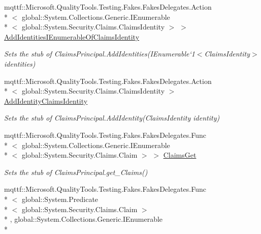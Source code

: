 \begin{DoxyCompactItemize}
\item 
mqttf\-::\-Microsoft.\-Quality\-Tools.\-Testing.\-Fakes.\-Fakes\-Delegates.\-Action\\*
$<$ global\-::\-System.\-Collections.\-Generic.\-I\-Enumerable\\*
$<$ global\-::\-System.\-Security.\-Claims.\-Claims\-Identity $>$ $>$ \hyperlink{class_system_1_1_security_1_1_principal_1_1_fakes_1_1_stub_generic_principal_adcc034cdba70b2a88e2e0c7e5b2cba56}{Add\-Identities\-I\-Enumerable\-Of\-Claims\-Identity}
\begin{DoxyCompactList}\small\item\em Sets the stub of Claims\-Principal.\-Add\-Identities(I\-Enumerable`1$<$Claims\-Identity$>$ identities)\end{DoxyCompactList}\item 
mqttf\-::\-Microsoft.\-Quality\-Tools.\-Testing.\-Fakes.\-Fakes\-Delegates.\-Action\\*
$<$ global\-::\-System.\-Security.\-Claims.\-Claims\-Identity $>$ \hyperlink{class_system_1_1_security_1_1_principal_1_1_fakes_1_1_stub_generic_principal_ad9766ac4857ed377535703e4f771c3d0}{Add\-Identity\-Claims\-Identity}
\begin{DoxyCompactList}\small\item\em Sets the stub of Claims\-Principal.\-Add\-Identity(\-Claims\-Identity identity)\end{DoxyCompactList}\item 
mqttf\-::\-Microsoft.\-Quality\-Tools.\-Testing.\-Fakes.\-Fakes\-Delegates.\-Func\\*
$<$ global\-::\-System.\-Collections.\-Generic.\-I\-Enumerable\\*
$<$ global\-::\-System.\-Security.\-Claims.\-Claim $>$ $>$ \hyperlink{class_system_1_1_security_1_1_principal_1_1_fakes_1_1_stub_generic_principal_a1140f10a8bdb673109699319bf6280f9}{Claims\-Get}
\begin{DoxyCompactList}\small\item\em Sets the stub of Claims\-Principal.\-get\-\_\-\-Claims()\end{DoxyCompactList}\item 
mqttf\-::\-Microsoft.\-Quality\-Tools.\-Testing.\-Fakes.\-Fakes\-Delegates.\-Func\\*
$<$ global\-::\-System.\-Predicate\\*
$<$ global\-::\-System.\-Security.\-Claims.\-Claim $>$\\*
, global\-::\-System.\-Collections.\-Generic.\-I\-Enumerable\\*

\end{DoxyCompactItemize}
